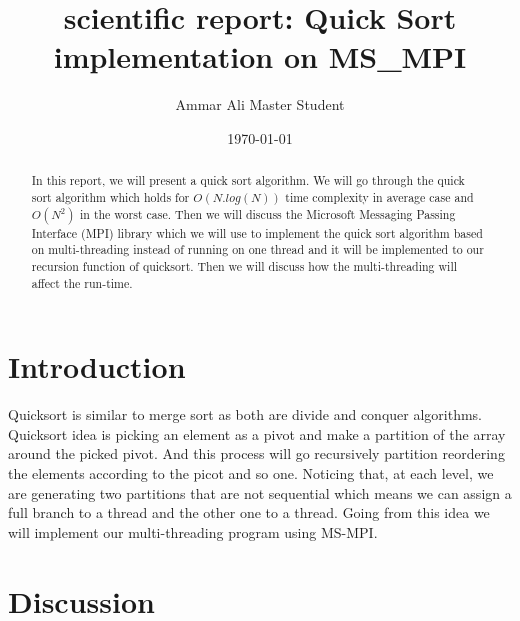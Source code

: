 \documentclass[preprint,pre,floats,aps,amsmath,amssymb]{revtex4}
\begin{document}
\title{scientific report: Quick Sort implementation on MS\_MPI 
}
\author{Ammar Ali Master Student}
\date{\today}



\newpage
\begin{abstract}
	
In this report, we will present a quick sort algorithm. We will go through the quick sort algorithm which holds for $O(N.log(N))$ time complexity in average case and $O(N^2)$ in the worst case. Then we will discuss the Microsoft Messaging Passing Interface (MPI) library which we will use to implement the quick sort algorithm based on multi-threading instead of running on one thread and it will be implemented to our recursion function of quicksort. Then we will discuss how the multi-threading will affect the run-time.
  
\end{abstract}

\maketitle

\section{Introduction}
\label{sec:intro}
Quicksort is similar to merge sort as both are divide and conquer algorithms. Quicksort idea is picking an element as a pivot and make a partition of the array around the picked pivot.
And this process will go recursively partition reordering the elements according to the picot and so one.
Noticing that, at each level, we are generating two partitions that are not sequential which means we can assign a full branch to a thread and the other one to a thread. Going from this idea we will implement our multi-threading program using MS-MPI.    

\section{Discussion}
	\label{sec:Discussion}
\end{document}
